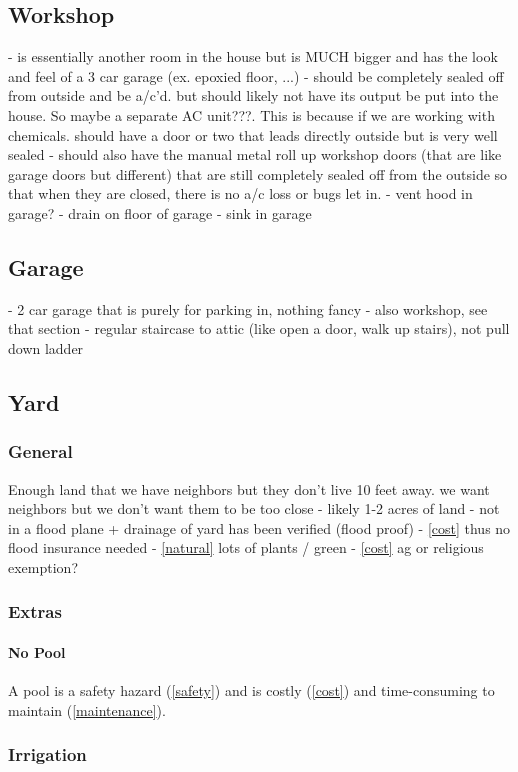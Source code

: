 \documentclass{article}
\begin{document}
\subsection{Workshop}
- is essentially another room in the house but is MUCH bigger and has the look and feel of a 3 car garage (ex. epoxied floor, ...)
    - should be completely sealed off from outside and be a/c'd. but should likely not have its output be put into the house. So maybe a separate AC unit???. This is because if we are working with chemicals. should have a door or two that leads directly outside but is very well sealed
	- should also have the manual metal roll up workshop doors (that are like garage doors but different) that are still completely sealed off from the outside so that when they are closed, there is no a/c loss or bugs let in.
- vent hood in garage?
- drain on floor of garage
- sink in garage

\subsection{Garage}
- 2 car garage that is purely for parking in, nothing fancy
- also workshop, see that section
- regular staircase to attic (like open a door, walk up stairs), not pull down ladder

\subsection{Yard}
\subsubsection{General}
Enough land that we have neighbors but they don't live 10 feet away. we want neighbors but we don't want them to be too close
    - likely 1-2 acres of land
    - not in a flood plane + drainage of yard has been verified (flood proof)
        - \ref{cost} thus no flood insurance needed
- \ref{natural} lots of plants / green
- \ref{cost} ag or religious exemption?
\subsubsection{Extras}
\paragraph{No Pool} A pool is a safety hazard (\ref{safety})  and is costly (\ref{cost}) and time-consuming to maintain (\ref{maintenance}).

\subsubsection{Irrigation}
\end{document}
